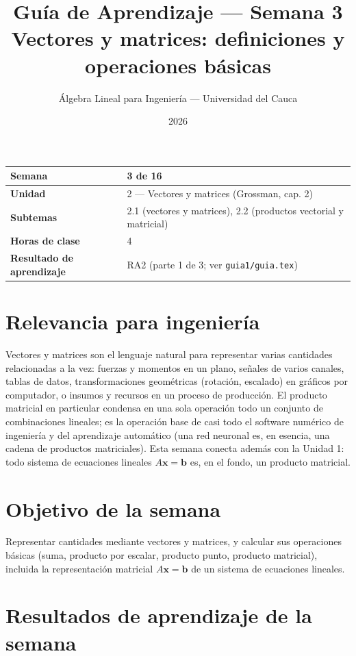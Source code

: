 \documentclass[11pt,letterpaper]{article}
\title{\textcolor{unicaucaverde}{\Large Guía de Aprendizaje — Semana 3}\\[4pt]
  \large Vectores y matrices: definiciones y operaciones básicas}
\author{Álgebra Lineal para Ingeniería --- Universidad del Cauca}
\date{2026}
\newcommand{\vv}[1]{\mathbf{#1}}
\begin{document}
\maketitle

\begin{center}
\begin{tabular}{|>{\bfseries}p{4cm}|p{10cm}|}
\hline
Semana & 3 de 16 \\ \hline
Unidad & 2 --- Vectores y matrices (Grossman, cap. 2) \\ \hline
Subtemas & 2.1 (vectores y matrices), 2.2 (productos vectorial y matricial) \\
\hline
Horas de clase & 4 \\ \hline
Resultado de aprendizaje & RA2 (parte 1 de 3; ver \texttt{guia1/guia.tex}) \\ \hline
\end{tabular}
\end{center}

\section*{Relevancia para ingeniería}

Vectores y matrices son el lenguaje natural para representar varias cantidades relacionadas a la
vez: fuerzas y momentos en un plano, señales de varios canales, tablas de datos, transformaciones
geométricas (rotación, escalado) en gráficos por computador, o insumos y recursos en un proceso de
producción. El producto matricial en particular condensa en una sola operación todo un conjunto de
combinaciones lineales; es la operación base de casi todo el software numérico de ingeniería y del
aprendizaje automático (una red neuronal es, en esencia, una cadena de productos matriciales). Esta
semana conecta además con la Unidad 1: todo sistema de ecuaciones lineales $A\vv{x}=\vv{b}$ es, en
el fondo, un producto matricial.

\section{Objetivo de la semana}

Representar cantidades mediante vectores y matrices, y calcular sus operaciones básicas (suma,
producto por escalar, producto punto, producto matricial), incluida la representación matricial
$A\vv{x}=\vv{b}$ de un sistema de ecuaciones lineales.

\section{Resultados de aprendizaje de la semana}
\end{document}
